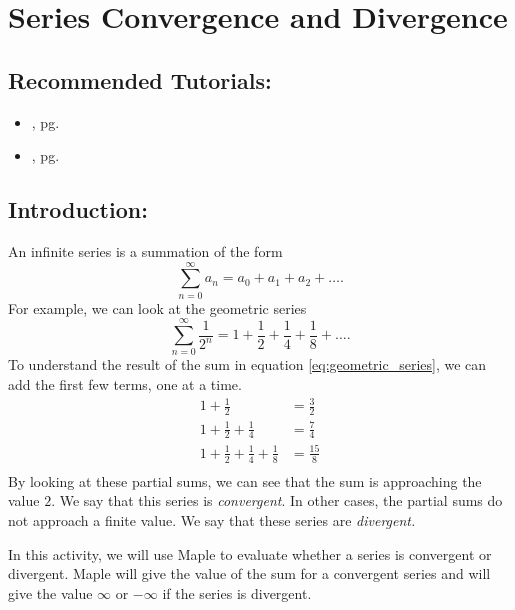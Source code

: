 \section{Series Convergence and Divergence}
\label{sec:series_convergence_and_divergence}	

\subsection*{Recommended Tutorials:}
\begin{itemize}[noitemsep]
    \item {}, pg. \pageref{chp:definite_and_indefinite_Integrals}
	\item {}, pg. \pageref{chp:sequence_and_sseries}
\end{itemize}

\subsection*{Introduction:}

An infinite series is a summation of the form
\[ \sum_{n=0}^{\infty} a_n = a_0 + a_1 + a_2 + \dots. \]
For example, we can look at the geometric series
\begin{equation}
    \label{eq:geometric_series}
    \sum_{n=0}^{\infty} \frac{1}{2^n} = 1 + \frac{1}{2} + \frac{1}{4} + \frac{1}{8} + \dots.
\end{equation}
To understand the result of the sum in equation \eqref{eq:geometric_series}, we can add the first few terms, one at a time. 
\begin{align*}
    1+\frac{1}{2} &= \frac{3}{2}\\
    1+\frac{1}{2}+\frac{1}{4} &= \frac{7}{4}\\
    1+\frac{1}{2}+\frac{1}{4}+\frac{1}{8} &= \frac{15}{8}\\
\end{align*}
By looking at these partial sums, we can see that the sum is approaching the value $2$. We say that this series is \textit{convergent}. In other cases, the partial sums do not approach a finite value. We say that these series are \textit{divergent.}

In this activity, we will use Maple to evaluate whether a series is convergent or divergent. Maple will give the value of the sum for a convergent series and will give the value $\infty$ or $-\infty$ if the series is divergent.

